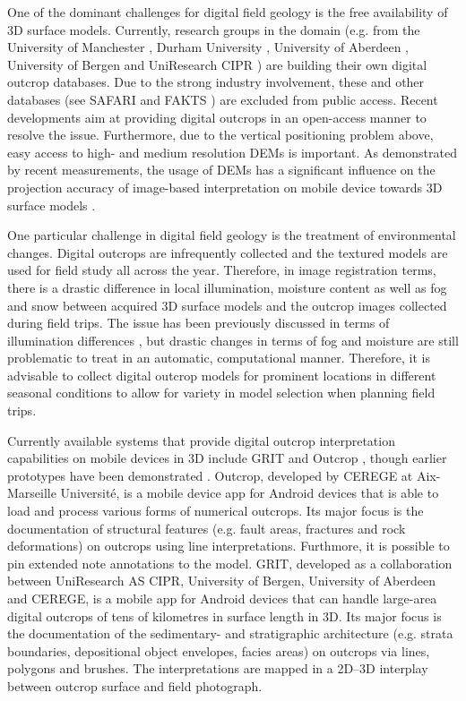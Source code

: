 \documentclass[review]{elsarticle}
\begin{document}
One of the dominant challenges for digital field geology is the free availability of 3D surface models. Currently, research groups in the domain (e.g. from the University of Manchester \cite{Hodgetts2013}, Durham University \cite{McCaffrey2005}, University of Aberdeen \cite{Howell2014}, University of Bergen and UniResearch CIPR \cite{Dreyer1993}) are building their own digital outcrop databases. Due to the strong industry involvement, these and other databases (see SAFARI \cite{Dreyer1993} and FAKTS \cite{Colombera2012a}) are excluded from public access. Recent developments aim at providing digital outcrops in an open-access manner \cite{Cawood2018} to resolve the issue. Furthermore, due to the vertical positioning problem above, easy access to high- and medium resolution \glspl{DEM} is important. As demonstrated by recent measurements, the usage of \glspl{DEM} has a significant influence on the projection accuracy of image-based interpretation on mobile device towards 3D surface models \cite{Kehl2017_VGC}.

One particular challenge in digital field geology is the treatment of environmental changes. Digital outcrops are infrequently collected and the textured models are used for field study all across the year. Therefore, in image registration terms, there is a drastic difference in local illumination, moisture content as well as fog and snow between acquired 3D surface models and the outcrop images collected during field trips. The issue has been previously discussed in terms of illumination differences \cite{Kehl2017_PHOR}, but drastic changes in terms of fog and moisture are still problematic to treat in an automatic, computational manner. Therefore, it is advisable to collect digital outcrop models for prominent locations in different seasonal conditions to allow for variety in model selection when planning field trips.

Currently available systems that provide digital outcrop interpretation capabilities on mobile devices in 3D include \gls{GRIT} \cite{Kehl2016_VGCabstract} and Outcrop \cite{Viseur2014_VGCabstract}, though earlier prototypes have been demonstrated \cite{Hama2013}. Outcrop, developed by \gls{CEREGE} at Aix-Marseille Universit\'{e}, is a mobile device app for Android devices that is able to load and process various forms of numerical outcrops. Its major focus is the documentation of structural features (e.g. fault areas, fractures and rock deformations) on outcrops using line interpretations. Furthmore, it is possible to pin extended note annotations to the model. \gls{GRIT}, developed as a collaboration between UniResearch AS CIPR, University of Bergen, University of Aberdeen and \gls{CEREGE}, is a mobile app for Android devices that can handle large-area digital outcrops of tens of kilometres in surface length in 3D. Its major focus is the documentation of the sedimentary- and stratigraphic architecture (e.g. strata boundaries, depositional object envelopes, facies areas) on outcrops via lines, polygons and brushes. The interpretations are mapped in a 2D--3D interplay between outcrop surface and field photograph.
\end{document}
